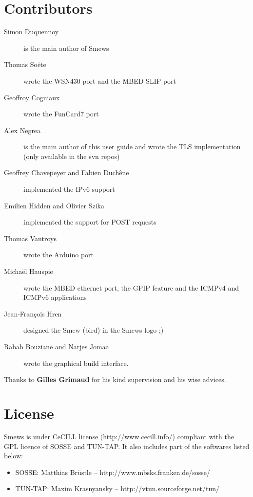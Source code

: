 \documentclass{report}
\begin{document}
\section{Contributors}

\begin{description}
 \item[Simon Duquennoy] is the main author of Smews
 \item[Thomas So\"{e}te] wrote the WSN430 port and the MBED SLIP port
 \item[Geoffroy Cogniaux] wrote the FunCard7 port
 \item[Alex Negrea] is the main author of this user guide and wrote the TLS
implementation (only available in the svn repos)
 \item[Geoffrey Chavepeyer \textnormal{and} Fabien Duchêne] implemented the IPv6
support
\item[Emilien Hidden \textnormal{and} Olivier Szika] implemented the support
  for POST requests
 \item[Thomas Vantroys] wrote the Arduino port
 \item[Michaël Hauspie] wrote the MBED ethernet port, the GPIP feature and the
   ICMPv4 and ICMPv6 applications
 \item[Jean-Fran\c{c}ois Hren] designed the Smew (bird) in the Smews logo ;)
 \item[Rabab Bouziane \textnormal{and} Narjes Jomaa] wrote the graphical build interface.
\end{description}
Thanks to \textbf{Gilles Grimaud} for his kind supervision and his wise advices.

\section{License}

Smews is under CeCILL license (\url{http://www.cecill.info/}) compliant with the GPL licence of SOSSE and TUN-TAP. It also includes part of the softwares listed below:
\begin{itemize}
 \item SOSSE: Matthias Br\"{u}stle -- http://www.mbsks.franken.de/sosse/
 \item TUN-TAP: Maxim Krasnyansky -- http://vtun.sourceforge.net/tun/
\end{itemize}
\end{document}
